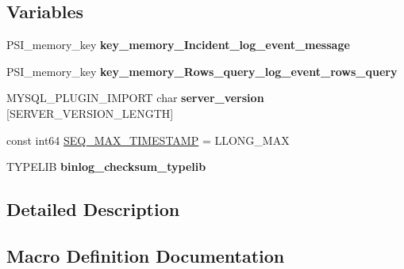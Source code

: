 \subsection*{Variables}
\begin{DoxyCompactItemize}
\item 
\mbox{\label{group__Replication_gaecc79518e6b11345997daed0b63d8c9c}} 
P\+S\+I\+\_\+memory\+\_\+key {\bfseries key\+\_\+memory\+\_\+\+Incident\+\_\+log\+\_\+event\+\_\+message}
\item 
\mbox{\label{group__Replication_gaaa3c73a12e0ac27997f15223a9c34160}} 
P\+S\+I\+\_\+memory\+\_\+key {\bfseries key\+\_\+memory\+\_\+\+Rows\+\_\+query\+\_\+log\+\_\+event\+\_\+rows\+\_\+query}
\item 
\mbox{\label{group__Replication_ga7f7df2aabb45d64e6d9350111ca9705c}} 
M\+Y\+S\+Q\+L\+\_\+\+P\+L\+U\+G\+I\+N\+\_\+\+I\+M\+P\+O\+RT char {\bfseries server\+\_\+version} \mbox{[}S\+E\+R\+V\+E\+R\+\_\+\+V\+E\+R\+S\+I\+O\+N\+\_\+\+L\+E\+N\+G\+TH\mbox{]}
\item 
const int64 \mbox{\hyperlink{group__Replication_gab1c0400a80a08c44cfbe884bbe3948a3}{S\+E\+Q\+\_\+\+M\+A\+X\+\_\+\+T\+I\+M\+E\+S\+T\+A\+MP}} = L\+L\+O\+N\+G\+\_\+\+M\+AX
\item 
\mbox{\label{group__Replication_ga4fbe92f9521738ba8f6e4de88d19e9e8}} 
T\+Y\+P\+E\+L\+IB {\bfseries binlog\+\_\+checksum\+\_\+typelib}
\end{DoxyCompactItemize}


\subsection{Detailed Description}


\subsection{Macro Definition Documentation}
\mbox{\label{group__Replication_ga4ebc2b131b4e1bdb6c0be57e4589851a}} 
